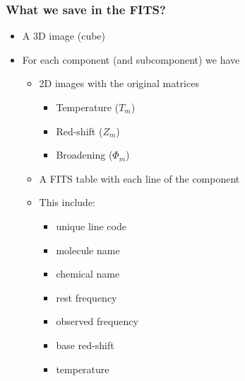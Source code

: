 \documentclass[slidestop,compress,mathserif,color,12pt]{beamer}
\begin{document}
\begin{frame}
  \frametitle{What we save in the FITS?}
\begin{minipage}{0.62\linewidth}
\scriptsize
\begin{itemize}
\item A 3D image (cube)
\item For each component (and subcomponent) we have
\begin{itemize}
   \item \scriptsize 2D images with the original matrices
   \begin{itemize}
      \item \scriptsize Temperature ($T_m$)
      \item Red-shift ($Z_m$)
      \item Broadening ($\Phi_m$)
   \end{itemize}
   \item A FITS table with each line of the component 
   \item This include: 
   \begin{itemize}
		\item \scriptsize unique line code
      \item molecule name
      \item chemical name
      \item rest frequency
      \item observed frequency
      \item base red-shift
      \item temperature  
   \end{itemize}
 \end{itemize}


\end{itemize}
\end{minipage}
\end{frame}
\end{document}

